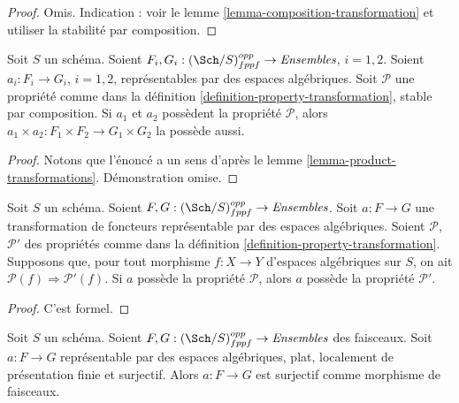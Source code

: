 \begin{proof}
Omis. Indication : voir le
lemme \ref{lemma-composition-transformation}
et utiliser la stabilité par composition.
\end{proof}

\begin{lemma}
\label{lemma-product-transformations-property}
Soit $S$ un schéma.
Soient $F_i, G_i : (\Sch/S)_{fppf}^{opp} \to \textit{Ensembles}$,
$i = 1, 2$.
Soient $a_i : F_i \to G_i$, $i = 1, 2$, représentables par des espaces algébriques.
Soit $\mathcal{P}$ une propriété comme dans la
définition \ref{definition-property-transformation},
stable par composition.
Si $a_1$ et $a_2$ possèdent la propriété $\mathcal{P}$, alors
$a_1 \times a_2 : F_1 \times F_2 \longrightarrow G_1 \times G_2$ la possède aussi.
\end{lemma}

\begin{proof}
Notons que l'énoncé a un sens d'après le
lemme \ref{lemma-product-transformations}.
Démonstration omise.
\end{proof}

\begin{lemma}
\label{lemma-transformations-property-implication}
Soit $S$ un schéma.
Soient $F, G : (\Sch/S)_{fppf}^{opp} \to \textit{Ensembles}$.
Soit $a : F \to G$ une transformation de foncteurs représentable par
des espaces algébriques.
Soient $\mathcal{P}$, $\mathcal{P}'$ des propriétés comme dans la
définition \ref{definition-property-transformation}.
Supposons que, pour tout morphisme $f : X \to Y$ d'espaces algébriques sur $S$,
on ait $\mathcal{P}(f) \Rightarrow \mathcal{P}'(f)$.
Si $a$ possède la propriété $\mathcal{P}$, alors
$a$ possède la propriété $\mathcal{P}'$.
\end{lemma}

\begin{proof}
C'est formel.
\end{proof}

\begin{lemma}
\label{lemma-surjective-flat-locally-finite-presentation}
Soit $S$ un schéma.
Soient $F, G : (\Sch/S)_{fppf}^{opp} \to \textit{Ensembles}$ des faisceaux.
Soit $a : F \to G$ représentable par des espaces algébriques, plat,
localement de présentation finie et surjectif.
Alors $a : F \to G$ est surjectif comme morphisme de faisceaux.
\end{lemma}

